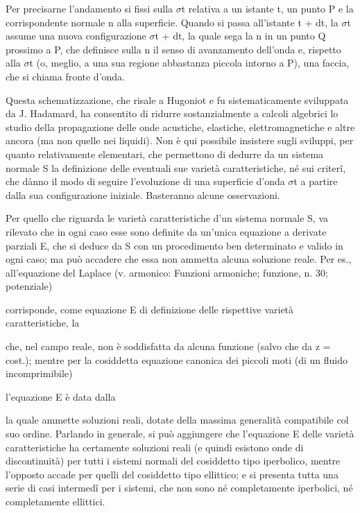 \documentclass[a4paper]{article}
\begin{document}
Per precisarne l'andamento si fissi sulla $\sigma$t relativa a un istante t, un punto P e la corrispondente normale n alla superficie. Quando si passa all'istante t + dt, la $\sigma$t assume una nuova configurazione $\sigma$t + dt, la quale sega la n in un punto Q prossimo a P, che definisce sulla n il senso di avanzamento dell'onda e, rispetto alla $\sigma$t (o, meglio, a una sua regione abbastanza piccola intorno a P), una faccia, che si chiama fronte d'onda.

Questa schematizzazione, che risale a Hugoniot e fu sistematicamente sviluppata da J. Hadamard, ha consentito di ridurre sostanzialmente a calcoli algebrici lo studio della propagazione delle onde acustiche, elastiche, elettromagnetiche e altre ancora (ma non quelle nei liquidi). Non è qui possibile insistere sugli sviluppi, per quanto relativamente elementari, che permettono di dedurre da un sistema normale S la definizione delle eventuali sue varietà caratteristiche, né sui criterî, che dànno il modo di seguire l'evoluzione di una superficie d'onda $\sigma$t a partire dalla sua configurazione iniziale. Basteranno alcune osservazioni.

Per quello che riguarda le varietà caratteristiche d'un sistema normale S, va rilevato che in ogni caso esse sono definite da un'unica equazione a derivate parziali E, che si deduce da S con un procedimento ben determinato e valido in ogni caso; ma può accadere che essa non ammetta alcuna soluzione reale. Per es., all'equazione del Laplace (v. armonico: Funzioni armoniche; funzione, n. 30; potenziale)

corrisponde, come equazione E di definizione delle rispettive varietà caratteristiche, la

che, nel campo reale, non è soddisfatta da alcuna funzione (salvo che da z = cost.); mentre per la cosiddetta equazione canonica dei piccoli moti (di un fluido incomprimibile)

l'equazione E è data dalla

la quale ammette soluzioni reali, dotate della massima generalità compatibile col suo ordine. Parlando in generale, si può aggiungere che l'equazione E delle varietà caratteristiche ha certamente soluzioni reali (e quindi esistono onde di discontinuità) per tutti i sistemi normali del cosiddetto tipo iperbolico, mentre l'opposto accade per quelli del cosiddetto tipo ellittico; e si presenta tutta una serie di casi intermedî per i sistemi, che non sono né completamente iperbolici, né completamente ellittici.
\end{document}
